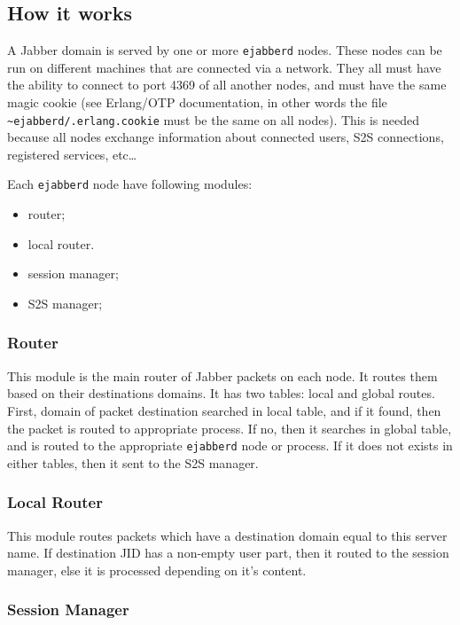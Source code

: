 \documentclass[10pt]{article}
\newcommand{\ejabberd}{\texttt{ejabberd}}
\newcommand{\Jabber}{Jabber}
\begin{document}
\subsection{How it works}
\label{sec:howitworks}


A \Jabber{} domain is served by one or more \ejabberd{} nodes.  These nodes can
be run on different machines that are connected via a network.  They all must
have the ability to connect to port 4369 of all another nodes, and must have
the same magic cookie (see Erlang/OTP documentation, in other words the file
\texttt{\~{}ejabberd/.erlang.cookie} must be the same on all nodes). This is
needed because all nodes exchange information about connected users, S2S
connections, registered services, etc\ldots



Each \ejabberd{} node have following modules:
\begin{itemize}
\item router;
\item local router.
\item session manager;
\item S2S manager;
\end{itemize}


\subsubsection{Router}

This module is the main router of \Jabber{} packets on each node.  It routes
them based on their destinations domains.  It has two tables: local and global
routes.  First, domain of packet destination searched in local table, and if it
found, then the packet is routed to appropriate process.  If no, then it
searches in global table, and is routed to the appropriate \ejabberd{} node or
process.  If it does not exists in either tables, then it sent to the S2S
manager.


\subsubsection{Local Router}

This module routes packets which have a destination domain equal to this server
name.  If destination JID has a non-empty user part, then it routed to the
session manager, else it is processed depending on it's content.


\subsubsection{Session Manager}
\end{document}

